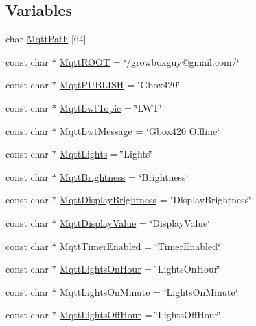 \subsection*{Variables}
\begin{DoxyCompactItemize}
\item 
char \mbox{\hyperlink{_m_q_t_t_8ino_ab5c7ea7beebf38f09a21ee747b1c9a12}{Mqtt\+Path}} \mbox{[}64\mbox{]}
\item 
const char $\ast$ \mbox{\hyperlink{_m_q_t_t_8ino_a89c1b9e2e7658f0cdb8b0bf58e72357b}{Mqtt\+R\+O\+OT}} = \char`\"{}/growboxguy@gmail.\+com/\char`\"{}
\item 
const char $\ast$ \mbox{\hyperlink{_m_q_t_t_8ino_a344cb894a938ef9812583b932b27e291}{Mqtt\+P\+U\+B\+L\+I\+SH}} = \char`\"{}Gbox420\char`\"{}
\item 
const char $\ast$ \mbox{\hyperlink{_m_q_t_t_8ino_a4167baa8d7d8ab8b721d5b13b0bba596}{Mqtt\+Lwt\+Topic}} = \char`\"{}L\+WT\char`\"{}
\item 
const char $\ast$ \mbox{\hyperlink{_m_q_t_t_8ino_ab489bce6689dd67335d708fbf2dbc518}{Mqtt\+Lwt\+Message}} = \char`\"{}Gbox420 Offline\char`\"{}
\item 
const char $\ast$ \mbox{\hyperlink{_m_q_t_t_8ino_aeff9dab1d68d9d398f57cde7f917cce5}{Mqtt\+Lights}} = \char`\"{}Lights\char`\"{}
\item 
const char $\ast$ \mbox{\hyperlink{_m_q_t_t_8ino_ae80a3bf9e4e5b642dedfcb2c4520f36d}{Mqtt\+Brightness}} = \char`\"{}Brightness\char`\"{}
\item 
const char $\ast$ \mbox{\hyperlink{_m_q_t_t_8ino_a798f1d6dbe160e92c1bec131a99f9a73}{Mqtt\+Display\+Brightness}} = \char`\"{}Display\+Brightness\char`\"{}
\item 
const char $\ast$ \mbox{\hyperlink{_m_q_t_t_8ino_ae6d68e2f352746baea76bb4213c81638}{Mqtt\+Display\+Value}} = \char`\"{}Display\+Value\char`\"{}
\item 
const char $\ast$ \mbox{\hyperlink{_m_q_t_t_8ino_a8c8ed013bfaa7bd42bd0ed0dcdf45198}{Mqtt\+Timer\+Enabled}} = \char`\"{}Timer\+Enabled\char`\"{}
\item 
const char $\ast$ \mbox{\hyperlink{_m_q_t_t_8ino_aa6deb166c98557809a49dd9bdcb8b138}{Mqtt\+Lights\+On\+Hour}} = \char`\"{}Lights\+On\+Hour\char`\"{}
\item 
const char $\ast$ \mbox{\hyperlink{_m_q_t_t_8ino_a30d5be777446e70b4aacb0082045d41f}{Mqtt\+Lights\+On\+Minute}} = \char`\"{}Lights\+On\+Minute\char`\"{}
\item 
const char $\ast$ \mbox{\hyperlink{_m_q_t_t_8ino_a357333d341895879b35e691ea3c907a8}{Mqtt\+Lights\+Off\+Hour}} = \char`\"{}Lights\+Off\+Hour\char`\"{}

\end{DoxyCompactItemize}
